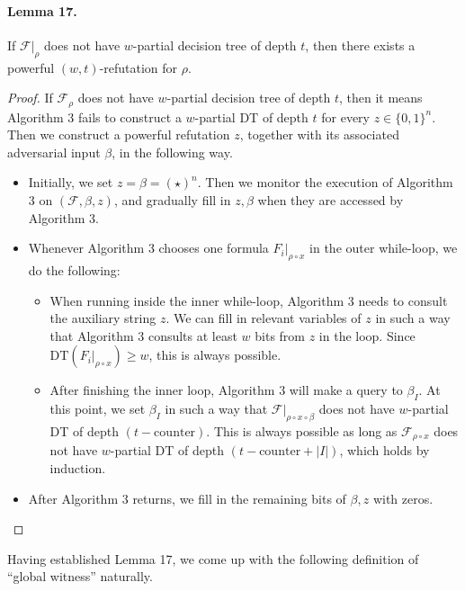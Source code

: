 \paragraph{Lemma 17.} If $\mathcal F|_\rho$ does not have $w$-partial decision tree of depth $t$, then there exists a powerful $(w,t)$-refutation for $\rho$.
\begin{proof}If $\mathcal F_\rho$ does not have $w$-partial decision tree of depth $t$, then it means Algorithm 3 fails to construct a $w$-partial DT of depth $t$ for every $z\in\{0,1\}^n$. Then we construct a powerful refutation $z$, together with its associated adversarial input $\beta$, in the following way.
\begin{itemize}\item Initially, we set $z=\beta=(\star)^n$. Then we monitor the execution of Algorithm 3 on $(\mathcal F,\beta,z)$, and gradually fill in $z,\beta$ when they are accessed by Algorithm 3.
\item Whenever Algorithm 3 chooses one formula $F_i|_{\rho\circ x}$ in the outer while-loop, we do the following:
\begin{itemize}\item When running inside the inner while-loop, Algorithm 3 needs to consult the auxiliary string $z$. We can fill in relevant variables of $z$ in such a way that Algorithm 3 consults at least $w$ bits from $z$ in the loop. Since $\mathrm{DT}(F_i|_{\rho\circ x})\ge w$, this is always possible.
\item After finishing the inner loop, Algorithm 3 will make a query to $\beta_I$. At this point, we set $\beta_I$ in such a way that $\mathcal F|_{\rho\circ x\circ\beta}$ does not have $w$-partial DT of depth $(t-\mathrm{counter})$. This is always possible as long as $\mathcal F_{\rho\circ x}$ does not have $w$-partial DT of depth $(t-\mathrm{counter}+|I|)$, which holds by induction.\end{itemize}
\item After Algorithm 3 returns, we fill in the remaining bits of $\beta,z$ with zeros.\end{itemize}\end{proof}
Having established Lemma 17, we come up with the following definition of ``global witness'' naturally.
